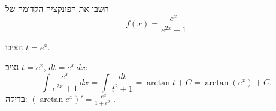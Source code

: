 
\begin{question}
חשבו את הפונקציה הקדומה של
\[ f(x)=\frac{e^x}{e^{2x}+1} \]
\end{question}

\begin{hint}
הציבו $t=e^x$.
\end{hint}

\begin{solution}
נציב $t=e^x$, $dt=e^x\,dx$:
\[ \int\frac{e^x}{e^{2x}+1}\,dx=\int\frac{dt}{t^2+1}=\arctan t+C=\boxed{\arctan(e^x)+C}. \]
בדיקה: $\left(\arctan e^x\right)'=\frac{e^x}{1+e^{2x}}$.
\end{solution}

